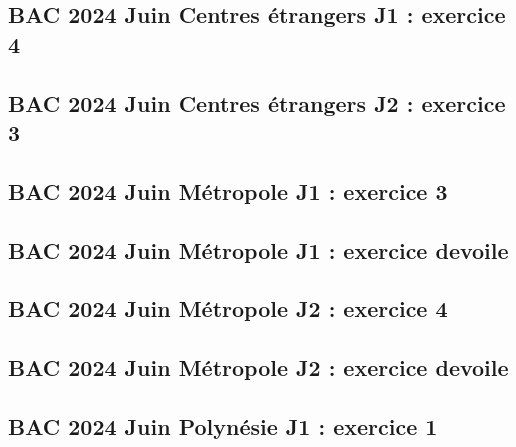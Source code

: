 \documentclass[lang=fr,edition=teacher,layout=sheet]{mxbook}
\begin{document}
\begingroup\endgroup
\par\bigskip
{}\subsection*{BAC 2024 Juin Centres étrangers J1 : exercice 4}
\begingroup\endgroup
\par\bigskip
{}\subsection*{BAC 2024 Juin Centres étrangers J2 : exercice 3}
\begingroup\endgroup
\par\bigskip
{}\subsection*{BAC 2024 Juin Métropole J1 : exercice 3}
\begingroup\endgroup
\par\bigskip
{}\subsection*{BAC 2024 Juin Métropole J1 : exercice devoile}
\begingroup\endgroup
\par\bigskip
{}\subsection*{BAC 2024 Juin Métropole J2 : exercice 4}
\begingroup\endgroup
\par\bigskip
{}\subsection*{BAC 2024 Juin Métropole J2 : exercice devoile}
\begingroup\endgroup
\par\bigskip
{}\subsection*{BAC 2024 Juin Polynésie J1 : exercice 1}
\end{document}
